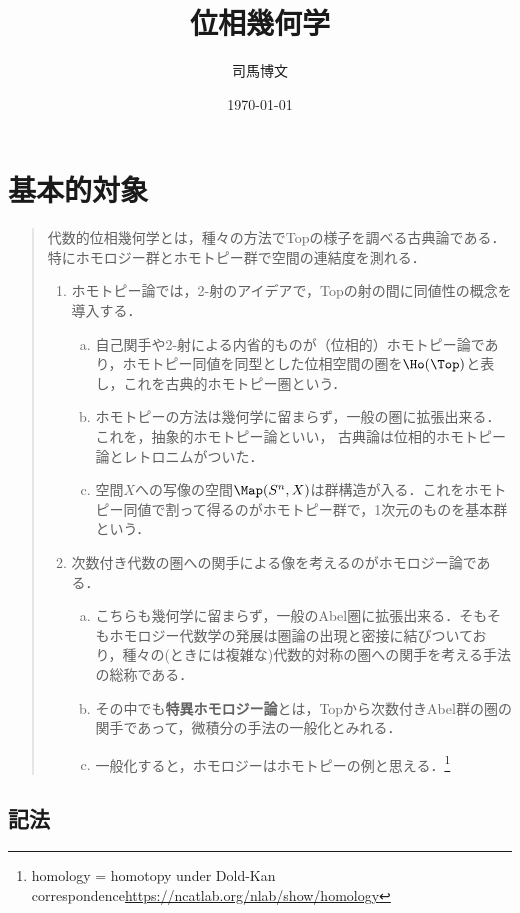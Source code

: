 \documentclass[uplatex, dvipdfmx]{jsreport}
\title{位相幾何学}
\author{司馬博文}
\date{\today}
\begin{document}
\tableofcontents

\chapter{基本的対象}

\begin{quotation}
    代数的位相幾何学とは，種々の方法でTopの様子を調べる古典論である．
    特にホモロジー群とホモトピー群で空間の連結度を測れる．
    \begin{enumerate}
        \item ホモトピー論では，2-射のアイデアで，Topの射の間に同値性の概念を導入する．
        \begin{enumerate}[(a)]
            \item 自己関手や2-射による内省的ものが（位相的）ホモトピー論であり，ホモトピー同値を同型とした位相空間の圏を$\Ho(\Top)$と表し，これを古典的ホモトピー圏という．
            \item ホモトピーの方法は幾何学に留まらず，一般の圏に拡張出来る．これを，抽象的ホモトピー論といい，
            古典論は位相的ホモトピー論とレトロニムがついた．
            \item 空間$X$への写像の空間$\Map(S^n,X)$は群構造が入る．これをホモトピー同値で割って得るのがホモトピー群で，1次元のものを基本群という．
        \end{enumerate}
        \item 次数付き代数の圏への関手による像を考えるのがホモロジー論である．
        \begin{enumerate}[(a)]
            \item こちらも幾何学に留まらず，一般のAbel圏に拡張出来る．そもそもホモロジー代数学の発展は圏論の出現と密接に結びついており，種々の(ときには複雑な)代数的対称の圏への関手を考える手法の総称である．
            \item その中でも\textbf{特異ホモロジー論}とは，Topから次数付きAbel群の圏の関手であって，微積分の手法の一般化とみれる．
            \item 一般化すると，ホモロジーはホモトピーの例と思える．\footnote{homology = homotopy under Dold-Kan correspondence\url{https://ncatlab.org/nlab/show/homology}}
        \end{enumerate}
    \end{enumerate}
\end{quotation}

\section{記法}
\end{document}
